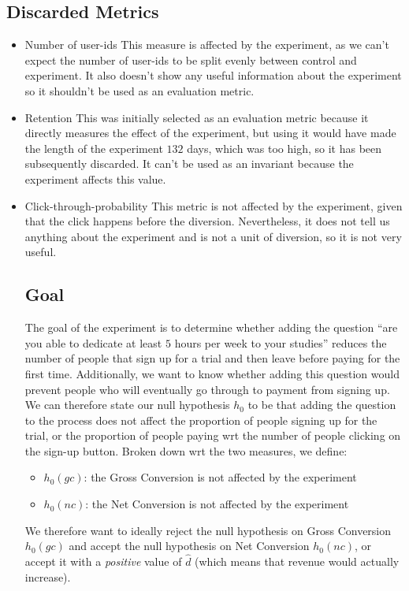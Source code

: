 \documentclass[12pt,a4paper]{article}
\begin{document}
\subsection{Discarded Metrics}
\begin{itemize}
\item Number of user-ids
This measure is affected by the experiment, as we can't expect the number of
user-ids to be split evenly between control and experiment. It also doesn't show
any useful information about the experiment so it shouldn't be used as an
evaluation metric.

\item Retention
This was initially selected as an evaluation metric because it directly measures
the effect of the experiment, but using it would have made the length of the
experiment $132$ days, which was too high, so it has been subsequently
discarded.  It can't be used as an invariant because the experiment affects this
value.

\item Click-through-probability
This metric is not affected by the experiment, given that the click happens
before the diversion. Nevertheless, it does not tell us anything about the
experiment and is not a unit of diversion, so it is not very useful.

\subsection{Goal}
The goal of the experiment is to determine whether adding the question ``are you
able to dedicate at least $5$ hours per week to your studies'' reduces the
number of people that sign up for a trial and then leave before paying for the
first time. Additionally, we want to know whether adding this question would
prevent people who will eventually go through to payment from signing up.
We can therefore state our null hypothesis $h_0$ to be that adding the question
to the process does not affect the proportion of people signing up for the
trial, or the proportion of people paying wrt the number of people clicking on
the sign-up button. Broken down wrt the two measures, we define:

\begin{itemize}
\item $h_0(gc)$: the Gross Conversion is not affected by the experiment
\item $h_0(nc)$: the Net Conversion is not affected by the experiment
\end{itemize}

We therefore want to ideally reject the null hypothesis on Gross Conversion
$h_0(gc)$ and accept the null hypothesis on Net Conversion $h_0(nc)$, or accept
it with a \emph{positive} value of $\hat{d}$ (which means that revenue would
actually increase).

\end{itemize}
\end{document}
